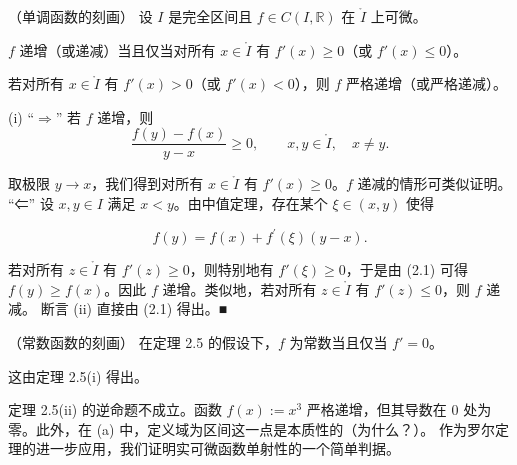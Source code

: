 \begin{theorem}

（单调函数的刻画） 设 $I$ 是完全区间且 $f \in C(I, \mathbb{R})$ 在 $\mathring{I}$ 上可微。

\begin{subitems}
\item

$f$ 递增（或递减）当且仅当对所有 $x \in \mathring{I}$ 有 $f'(x) \geq 0$（或 $f'(x) \leq 0$）。

\item

若对所有 $ x \in \mathring{I} $ 有 $ f'(x) > 0 $（或 $ f'(x) < 0 $），则 $ f $ 严格递增（或严格递减）。

\proofhead
(i) “$\Rightarrow$” 若 $f$ 递增，则
\[
\frac{f(y)-f(x)}{y-x}\geq0,\qquad x,y\in\mathring{I},\quad x\neq y.
\]

取极限 $ y \to x $，我们得到对所有 $ x \in \mathring{I} $ 有 $ f'(x) \geq 0 $。$ f $ 递减的情形可类似证明。
“⇐” 设 $ x, y \in I $ 满足 $x < y$。由中值定理，存在某个 $ \xi \in (x, y) $ 使得

\[
f(y)=f(x)+f^{\prime}(\xi)(y-x).
\]

若对所有 $ z \in \mathring{I} $ 有 $ f'(z) \geq 0 $，则特别地有 $ f'(\xi) \geq 0 $，于是由 (2.1) 可得 $ f(y) \geq f(x) $。因此 $ f $ 递增。类似地，若对所有 $ z \in \mathring{I} $ 有 $ f'(z) \leq 0 $，则 $ f $ 递减。
断言 (ii) 直接由 (2.1) 得出。■

\end{subitems}

\end{theorem}

\begin{remark}

\begin{items}
\item

（常数函数的刻画） 在定理 2.5 的假设下，$f$ 为常数当且仅当 $ f' = 0 $。

\proofhead
这由定理 2.5(i) 得出。
\item

定理 2.5(ii) 的逆命题不成立。函数 $ f(x) := x^3 $ 严格递增，但其导数在 $0$ 处为零。此外，在 (a) 中，定义域为区间这一点是本质性的（为什么？）。
作为罗尔定理的进一步应用，我们证明实可微函数单射性的一个简单判据。

\end{items}

\end{remark}

